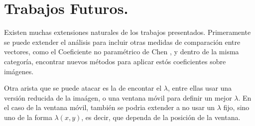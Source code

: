 \section{Trabajos Futuros.}

    Existen muchas extensiones naturales de los trabajos presentados. Primeramente se puede extender el an\'alisis para incluir otras medidas de comparaci\'on entre vectores, como el Coeficiente no paramétrico de Chen \cite{Chen2012}, y dentro de la misma categor\'ia, encontrar nuevos m\'etodos para aplicar est\'os coeficientes sobre im\'agenes. 

    Otra arista que se puede atacar es la de encontar el $\lambda$, entre ellas usar una versi\'on reducida de la ima\'agen, o una ventana m\'ovil para definir un mejor $\lambda$. En el caso de la ventana m\'ovil, tambi\'en se podria extender a no usar un $\lambda$ fijo, sino uno de la forma $\lambda(x,y)$, es decir, que dependa de la posici\'on de la ventana. 